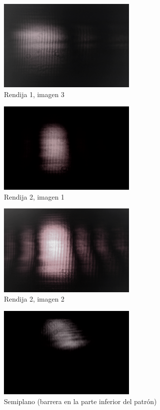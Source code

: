 \documentclass[12p]{article}
\begin{document}
\begin{figure}[h]
  \includegraphics[width=0.6\textwidth]{3.png}
  \centering
  \caption{Rendija 1, imagen 3}
\end{figure} 

\begin{figure}[h]
  \includegraphics[width=0.6\textwidth]{a.png}
  \centering
  \caption{Rendija 2, imagen 1}
\end{figure} 

\begin{figure}[h]
  \includegraphics[width=0.6\textwidth]{b.png}
  \centering
  \caption{Rendija 2, imagen 2}
\end{figure} 

\begin{figure}[h]
  \includegraphics[width=0.6\textwidth]{sp.png}
  \centering
  \caption{Semiplano (barrera en la parte inferior del patrón)}
\end{figure} 
\end{document}
